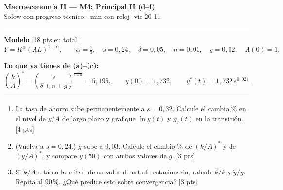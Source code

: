 \documentclass[11pt]{article}
\begin{document}
\begin{center}
{\Large\bfseries Macroeconomía II --- M4: Principal II (d--f)}\\[2pt]
Solow con progreso técnico \quad$\cdot$ min con reloj \quad$\cdot$\quad vie 20-11
\end{center}

\hrule\medskip

\textbf{Modelo} \hfill [18 pts en total]
\[
Y = K^{\alpha}(AL)^{1-\alpha}, \qquad \alpha = \tfrac13,\quad s = 0{,}24,\quad \delta = 0{,}05,\quad n = 0{,}01,\quad g = 0{,}02,\quad A(0)=1.
\]

\textbf{Lo que ya tienes de (a)--(c):}
\[
\left(\frac{k}{A}\right)^{*} = \left(\frac{s}{\delta+n+g}\right)^{\frac{1}{1-\alpha}} = 5{,}196,
\qquad y(0) = 1{,}732,
\qquad y^{*}(t) = 1{,}732\, e^{0{,}02\,t}.
\]

\medskip\hrule\medskip

\begin{enumerate}[label=\textbf{(\alph*)}, start=4, leftmargin=*, itemsep=10pt]
\item La tasa de ahorro sube permanentemente a $s = 0{,}32$. Calcule el cambio \% en el nivel de $y/A$ de largo plazo y grafique $\ln y(t)$ y $g_y(t)$ en la transición. \hfill [4 pts]

\item (Vuelva a $s = 0{,}24$.) $g$ sube a $0{,}03$. Calcule el cambio \% de $(k/A)^{*}$ y de $(y/A)^{*}$, y compare $y(50)$ con ambos valores de $g$. \hfill [3 pts]

\item Si $k/A$ está en la mitad de su valor de estado estacionario, calcule $\dot k/k$ y $\dot y/y$. Repita al 90\,\%. ¿Qué predice esto sobre convergencia? \hfill [3 pts]
\end{enumerate}
\end{document}
